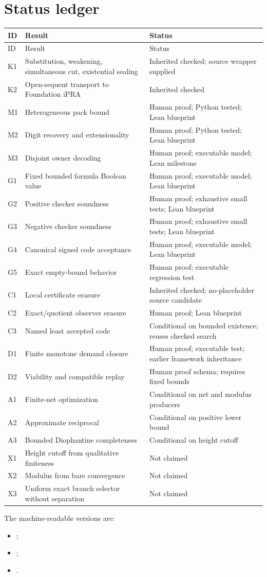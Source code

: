 \section{Status ledger}

\begin{longtable}{p{}p{}p{}}
\toprule
ID & Result & Status \\
\midrule
\endfirsthead
\toprule
ID & Result & Status \\
\midrule
\endhead
K1 & Substitution, weakening, simultaneous cut, existential sealing &
Inherited checked; source wrapper supplied \\
K2 & Open-sequent transport to Foundation iPRA & Inherited checked \\
M1 & Heterogeneous pack bound & Human proof; Python tested; Lean blueprint \\
M2 & Digit recovery and extensionality & Human proof; Python tested; Lean blueprint \\
M3 & Disjoint owner decoding & Human proof; executable model; Lean milestone \\
G1 & Fixed bounded formula Boolean value & Human proof; executable model; Lean blueprint \\
G2 & Positive checker soundness & Human proof; exhaustive small tests; Lean blueprint \\
G3 & Negative checker soundness & Human proof; exhaustive small tests; Lean blueprint \\
G4 & Canonical signed code acceptance & Human proof; executable model; Lean blueprint \\
G5 & Exact empty-bound behavior & Human proof; executable regression test \\
C1 & Local certificate erasure & Inherited checked; no-placeholder source candidate \\
C2 & Exact/quotient observer erasure & Human proof; Lean blueprint \\
C3 & Named least accepted code & Conditional on bounded existence; reuses checked search \\
D1 & Finite monotone demand closure & Human proof; executable test; earlier framework inheritance \\
D2 & Viability and compatible replay & Human proof schema; requires fixed bounds \\
A1 & Finite-net optimization & Conditional on net and modulus producers \\
A2 & Approximate reciprocal & Conditional on positive lower bound \\
A3 & Bounded Diophantine completeness & Conditional on height cutoff \\
X1 & Height cutoff from qualitative finiteness & Not claimed \\
X2 & Modulus from bare convergence & Not claimed \\
X3 & Uniform exact branch selector without separation & Not claimed \\
\bottomrule
\end{longtable}

The machine-readable versions are:
\begin{itemize}
\item {};
\item {};
\item {}.
\end{itemize}
